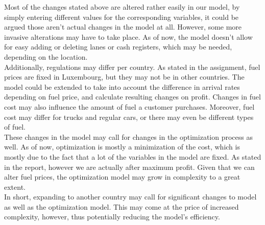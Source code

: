 Most of the changes stated above are altered rather easily in our model, by simply entering different values for the corresponding variables, it could be argued those aren't actual changes in the model at all.
However, some more invasive alterations may have to take place.
As of now, the model doesn't allow for easy adding or deleting lanes or cash registers, which may be needed, depending on the location. \\
Additionally, regulations may differ per country.
As stated in the assignment, fuel prices are fixed in Luxembourg, but they may not be in other countries.
The model could be extended to take into account the difference in arrival rates depending on fuel price, and calculate resulting changes on profit.
Changes in fuel cost may also influence the amount of fuel a customer purchases.
Moreover, fuel cost may differ for trucks and regular cars, or there may even be different types of fuel. \\

These changes in the model may call for changes in the optimization process as well.
As of now, optimization is mostly a minimization of the cost, which is mostly due to the fact that a lot of the variables in the model are fixed.
As stated in the report, however we are actually after maximum profit.
Given that we can alter fuel prices, the optimization model may grow in complexity to a great extent. \\
In short, expanding to another country may call for significant changes to model as well as the optimization model.
This may come at the price of increased complexity, however, thus potentially reducing the model's efficiency.